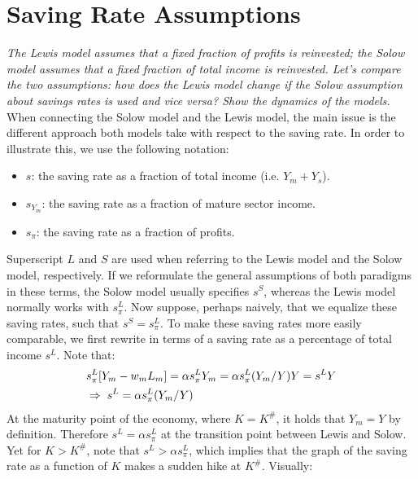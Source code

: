 \documentclass[a4paper]{article}
\begin{document}
\section{Saving Rate Assumptions}
\textit{The Lewis model assumes that a fixed fraction of profits is reinvested; the Solow model assumes that a fixed fraction of total income is reinvested. Let’s compare the two assumptions: how does the Lewis model change if the Solow assumption about savings rates is used and vice versa? Show the dynamics of the models.}\\
\newline
When connecting the Solow model and the Lewis model, the main issue is the different approach both models take with respect to the saving rate. In order to illustrate this, we use the following notation:
\begin{itemize}
\item \hspace{0.1cm}$s$: the saving rate as a fraction of total income (i.e. $Y_m+Y_s$). 
\item \hspace{0.1cm}$s_{Y_m}$: the saving rate as a fraction of mature sector income. 
\item \hspace{0.1cm}$s_{\pi}$: the saving rate as a fraction of profits.
\end{itemize}
Superscript $L$ and $S$ are used when referring to the Lewis model and the Solow model, respectively. If we reformulate the general assumptions of both paradigms in these terms, the Solow model usually specifies $s^S$, whereas the Lewis model normally works with $s_{\pi}^L$. Now suppose, perhaps naively, that we equalize these saving rates, such that $s^S=s_{\pi}^L$. To make these saving rates more easily comparable, we first rewrite  in terms of a saving rate as a percentage of total income $s^L$. Note that:
\begin{align}
	&{}							s_{\pi}^L[Y_m-w_mL_m]={\alpha}s_{\pi}^LY_m={\alpha}s_{\pi}^L(Y_m/Y)Y=s^LY\nonumber\\
    &\Rightarrow\hspace{0.1cm}	s^L={\alpha}s_{\pi}^L(Y_m/Y)
\end{align}
At the maturity point of the economy, where $K=K^{\#}$, it holds that $Y_m=Y$ by definition. Therefore $s^L={\alpha}s_{\pi}^L$ at the transition point between Lewis and Solow. Yet for $K>K^{\#}$, note that $s^L>{\alpha}s_{\pi}^L$, which implies that the graph of the saving rate as a function of $K$ makes a sudden hike at $K^{\#}$. Visually:
\end{document}
